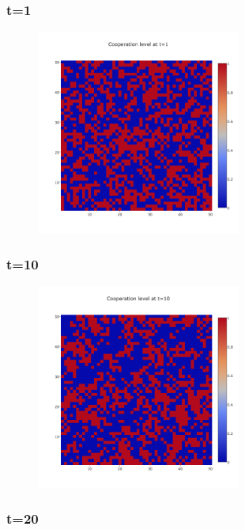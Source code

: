 \documentclass[11pt]{article}
\begin{document}
\subsubsection{t=1}

\begin{figure}[H]
\centering
   \includegraphics[width=0.6\textwidth]{img/part2/part2-moore-visu-1.png}
\end{figure}

\subsubsection{t=10}

\begin{figure}[H]
\centering
   \includegraphics[width=0.6\textwidth]{img/part2/part2-moore-visu-10.png}
\end{figure}

\subsubsection{t=20}
\end{document}
